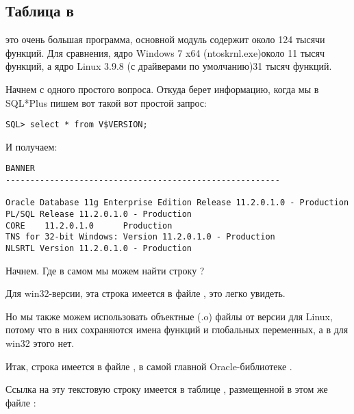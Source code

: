 \subsection{Таблица  в \oracle}

\myindex{\oracle}
 это очень большая программа, основной модуль  содержит около 124 тысячи функций. Для сравнения, ядро Windows 7 x64 (ntoskrnl.exe)\EMDASH{}около 11 тысяч функций, а ядро Linux 3.9.8 (с драйверами по умолчанию)\EMDASH{}31 тысяч функций.

Начнем с одного простого вопроса. Откуда \oracle берет информацию, когда мы в SQL*Plus пишем вот такой вот простой запрос:

\begin{lstlisting}
SQL> select * from V$VERSION;
\end{lstlisting}

И получаем:

\begin{lstlisting}
BANNER
--------------------------------------------------------

Oracle Database 11g Enterprise Edition Release 11.2.0.1.0 - Production
PL/SQL Release 11.2.0.1.0 - Production
CORE    11.2.0.1.0      Production
TNS for 32-bit Windows: Version 11.2.0.1.0 - Production
NLSRTL Version 11.2.0.1.0 - Production
\end{lstlisting}

Начнем. Где в самом \oracle мы можем найти строку ?

Для win32-версии, эта строка имеется в файле , это легко увидеть.

Но мы также можем использовать объектные (.o) файлы от версии \oracle для Linux, потому что в них сохраняются имена функций и глобальных переменных, а в  для win32 этого нет.

Итак, строка  имеется в файле , в самой главной Oracle-библиотеке .

Ссылка на эту текстовую строку имеется в таблице , размещенной в этом же файле :

